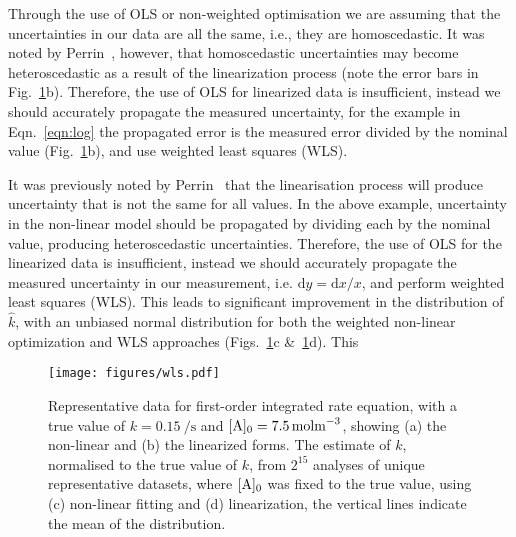 \documentclass[journal=jceda8,manuscript=article]{achemso}
\begin{document}
Through the use of OLS or non-weighted optimisation we are assuming that the uncertainties in our data are all the same, i.e., they are homoscedastic. 
It was noted by Perrin~\cite{perrin_linear_2017}, however, that homoscedastic uncertainties may become heteroscedastic as a result of the linearization process (note the error bars in Fig.~\ref{fig:wls}b). 
Therefore, the use of OLS for linearized data is insufficient, instead we should accurately propagate the measured uncertainty, for the example in Eqn.~\ref{eqn:log} the propagated error is the measured error divided by the nominal value (Fig.~\ref{fig:wls}b), and use weighted least squares (WLS).


It was previously noted by Perrin~\cite{perrin_linear_2017} that the linearisation process will produce uncertainty that is not the same for all values. 
In the above example, uncertainty in the non-linear model should be propagated by dividing each by the nominal value, producing heteroscedastic uncertainties. 
Therefore, the use of OLS for the linearized data is insufficient, instead we should accurately propagate the measured uncertainty in our measurement, i.e. $\mathrm{d}y = \mathrm{d}x / x$, and perform weighted least squares (WLS). 
This leads to significant improvement in the distribution of $\hat{k}$, with an unbiased normal distribution for both the weighted non-linear optimization and WLS approaches (Figs.~\ref{fig:wls}c \&~\ref{fig:wls}d).
This 


%
\begin{figure}
  \texttt{[image: figures/wls.pdf]}
  \caption{
    Representative data for first-order integrated rate equation, with a true value of $k=\SI{0.15}{\per\second}$ and $[\ce{A}]_0=\SI{7.5}{\mol\m^{-3}}$, showing (a) the non-linear and (b) the linearized forms. 
    The estimate of $k$, normalised to the true value of $k$, from $2^{15}$ analyses of unique representative datasets, where $[\ce{A}]_0$ was fixed to the true value, using (c) non-linear fitting and (d) linearization, the vertical lines indicate the mean of the distribution. 
    }
  \label{fig:wls}
\end{figure}
%
\end{document}

